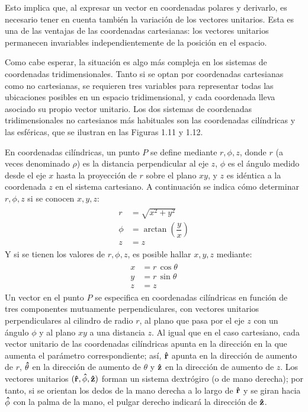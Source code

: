 \documentclass[hidelinks,12pt]{article}
\begin{document}
\par
Esto implica que, al expresar un vector en coordenadas polares y derivarlo, es necesario tener en cuenta también la variación de los vectores unitarios. Esta es una de las ventajas de las coordenadas cartesianas: los vectores unitarios permanecen invariables independientemente de la posición en el espacio.
\par
Como cabe esperar, la situación es algo más compleja en los sistemas de coordenadas tridimensionales. Tanto si se optan por coordenadas cartesianas como no cartesianas, se requieren tres variables para representar todas las ubicaciones posibles en un espacio tridimensional, y cada coordenada lleva asociado su propio vector unitario. Los dos sistemas de coordenadas tridimensionales no cartesianos más habituales son las coordenadas cilíndricas y las esféricas, que se ilustran en las Figuras 1.11 y 1.12.
\par
En coordenadas cilíndricas, un punto $P$ se define mediante $r, \phi, z$, donde $r$ (a veces denominado $\rho$) es la distancia perpendicular al eje $z$, $\phi$ es el ángulo medido desde el eje $x$ hasta la proyección de $r$ sobre el plano $xy$, y $z$ es idéntica a la coordenada $z$ en el sistema cartesiano. A continuación se indica cómo determinar $r, \phi, z$ si se conocen $x, y, z$:
\begin{align}
\begin{aligned}
    r &= \sqrt{x^{2} + y^{2}} \\[0.5em]
    \phi &= \arctan \left( \dfrac{y}{x} \right) \\[0.5em]
    z &= z 
\end{aligned}
\label{eq:ecuacion_01_12}
\end{align}
Y si se tienen los valores de $r, \phi, z$, es posible hallar $x, y, z$ mediante:
\begin{align}
\begin{aligned}
    x &= r \, \cos \theta \\
    y &= r \, \sin \theta \\
    z &= z
\end{aligned}
\label{eq:ecuacion_01_13}
\end{align}
Un vector en el punto $P$ se especifica en coordenadas cilíndricas en función de tres componentes mutuamente perpendiculares, con vectores unitarios perpendiculares al cilindro de radio $r$, al plano que pasa por el eje $z$ con un ángulo $\phi$ y al plano $xy$ a una distancia $z$. Al igual que en el caso cartesiano, cada vector unitario de las coordenadas cilíndricas apunta en la dirección en la que aumenta el parámetro correspondiente; así, $\vu{r}$ apunta en la dirección de aumento de $r$, $\vu{\theta}$ en la dirección de aumento de $\theta$ y $\vu{z}$ en la dirección de aumento de $z$. Los vectores unitarios $(\vu{r}, \vu{\phi}, \vu{z})$ forman un sistema dextrógiro (o de mano derecha); por tanto, si se orientan los dedos de la mano derecha a lo largo de $\vu{r}$ y se giran hacia $\vu{\phi}$ con la palma de la mano, el pulgar derecho indicará la dirección de $\vu{z}$.
\end{document}
